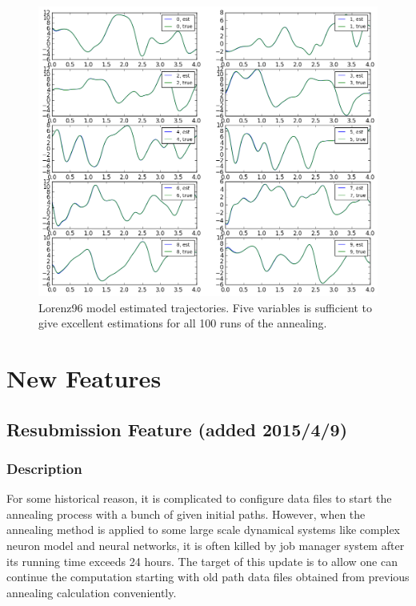 \documentclass[11pt]{article}
\begin{document}
{\begin{figure}[h]
\centering
\includegraphics[width=1\textwidth]{figure/Lorenz96_ext/estimation.png}
\caption{Lorenz96 model estimated trajectories. Five variables is sufficient to give excellent estimations for all 100 runs of the annealing.}
\label{fig:Lorenz96_ext_path}
\end{figure}


\clearpage


\iffalse
\newpage
\section{New Features}
\subsection{ Resubmission Feature (added 2015/4/9)}
\subsubsection{Description}
For some historical reason, it is complicated to configure data files to start the annealing process with a bunch of given initial paths. However, when the annealing method is applied to some large scale dynamical systems like complex neuron model and neural networks, it is often killed by job manager system after its running time exceeds 24 hours. The target of this update is to allow one can continue the computation starting with old path data files obtained from previous annealing calculation conveniently.
}
\end{document}
